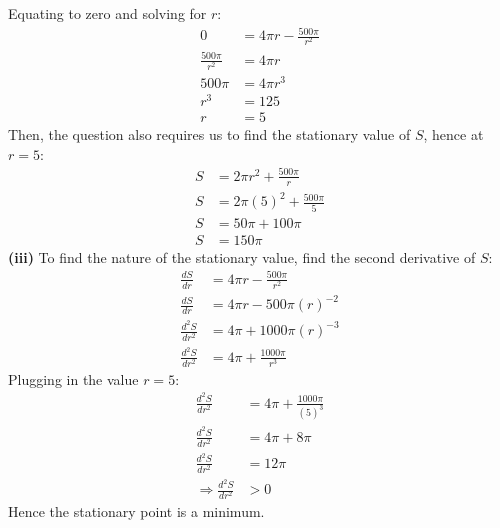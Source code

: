 \documentclass[hidelinks, a4paper, 12pt]{article}
\newcommand{\bd}{\textbf}
\newcommand{\thus}{\Rightarrow}
\begin{document}
            Equating to zero and solving for $r$:
            \[\begin{split}
                0 &= 4\pi r -\frac{500\pi}{r^2}\\
                \frac{500\pi}{r^2} &= 4\pi r\\
                500\pi &= 4\pi r^3\\
                r^3 &= 125\\
                r &= 5
            \end{split}\]
            Then, the question also requires us to find the stationary value of $S$, hence at $r = 5$:
            \[\begin{split}
                S &= 2\pi r^2 + \frac{500\pi}{r}\\
                S &= 2\pi (5)^2 + \frac{500\pi}{5}\\
                S &= 50\pi + 100 \pi\\
                S &= 150\pi
            \end{split}\]
            \bd{(iii)} To find the nature of the stationary value, find the second derivative of $S$:
            \[\begin{split}
                \frac{dS}{dr} &= 4\pi r -\frac{500\pi}{r^2}\\
                \frac{dS}{dr} &= 4\pi r- 500\pi(r)^{-2}\\
                \frac{d^2S}{dr^2} &= 4\pi + 1000\pi(r)^{-3}\\
                \frac{d^2S}{dr^2} &= 4\pi + \frac{1000\pi}{r^3}
            \end{split}\]
            Plugging in the value $r = 5$:
            \[\begin{split}
                \frac{d^2S}{dr^2} &= 4\pi + \frac{1000\pi}{(5)^3}\\
                \frac{d^2S}{dr^2} &= 4\pi + 8\pi\\
                \frac{d^2S}{dr^2} &= 12\pi\\
                \thus \frac{d^2S}{dr^2} &> 0
            \end{split}\]
            Hence the stationary point is a minimum.
\end{document}
